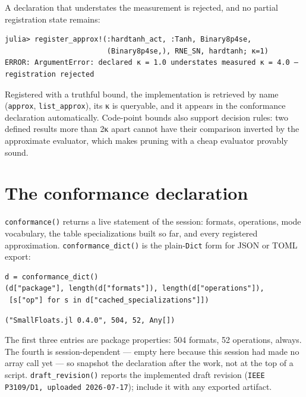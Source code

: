 A declaration that understates the measurement is rejected, and no partial registration state remains:




\nopagebreak[4]
\begin{verbatim}
julia> register_approx!(:hardtanh_act, :Tanh, Binary8p4se,
                        (Binary8p4se,), RNE_SN, hardtanh; κ=1)
ERROR: ArgumentError: declared κ = 1.0 understates measured κ = 4.0 — registration rejected
\end{verbatim}



Registered with a truthful bound, the implementation is retrieved by name (\texttt{approx}, \texttt{list\_\allowbreak{}approx}), its κ is queryable, and it appears in the conformance declaration automatically. Code-point bounds also support decision rules: two defined results more than 2κ apart cannot have their comparison inverted by the approximate evaluator, which makes pruning with a cheap evaluator provably sound.



\section{The conformance declaration}



\label{15718388096894276699}{}


\texttt{conformance()} returns a live statement of the session: formats, operations, mode vocabulary, the table specializations built so far, and every registered approximation. \texttt{conformance\_\allowbreak{}dict()} is the plain-\texttt{Dict} form for JSON or TOML export:




\nopagebreak[4]
\begin{minipage}{\linewidth}
\begin{verbatim}
d = conformance_dict()
(d["package"], length(d["formats"]), length(d["operations"]),
 [s["op"] for s in d["cached_specializations"]])
\end{verbatim}




\begin{verbatim}
("SmallFloats.jl 0.4.0", 504, 52, Any[])
\end{verbatim}
\end{minipage}




The first three entries are package properties: 504 formats, 52 operations, always. The fourth is session-dependent — empty here because this session had made no array call yet — so snapshot the declaration after the work, not at the top of a script. \texttt{draft\_\allowbreak{}revision()} reports the implemented draft revision (\texttt{IEEE P3109/\allowbreak{}D1, uploaded 2026-07-17}); include it with any exported artifact.



